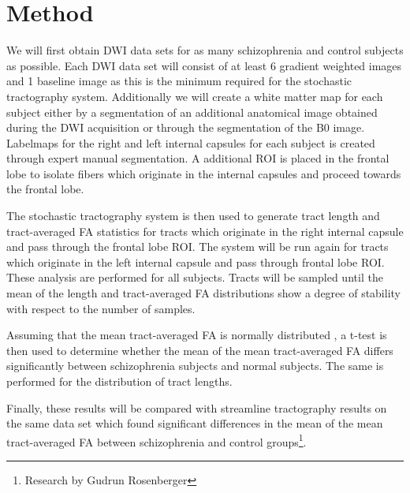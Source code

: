 \section{Method}
We will first obtain DWI data sets for as many schizophrenia and control subjects as possible.  Each DWI data set will consist of at least 6 gradient weighted images and 1 baseline image as this is the minimum required for the stochastic tractography system.  Additionally we will create a white matter map for each subject either by a segmentation of an additional anatomical image obtained during the DWI acquisition or through the segmentation of the B0 image.  Labelmaps for the right and left internal capsules for each subject is created through expert manual segmentation.  A additional ROI is placed in the frontal lobe to isolate fibers which originate in the internal capsules and proceed towards the frontal lobe.

The stochastic tractography system is then used to generate tract length and tract-averaged FA statistics for tracts which originate in the right internal capsule and pass through the frontal lobe ROI.  The system will be run again for tracts which originate in the left internal capsule and pass through frontal lobe ROI.  These analysis are performed for all subjects.  Tracts will be sampled until the mean of the length and tract-averaged FA distributions show a degree of stability with respect to the number of samples.

Assuming that the mean tract-averaged FA is normally distributed , a t-test is then used to determine whether the mean of the mean tract-averaged FA differs significantly between schizophrenia subjects and normal subjects.  The same is performed for the distribution of tract lengths.

Finally, these results will be compared with streamline tractography results on the same data set which found significant differences in the mean of the mean tract-averaged FA between schizophrenia and control groups\footnote{Research by Gudrun Rosenberger}.




